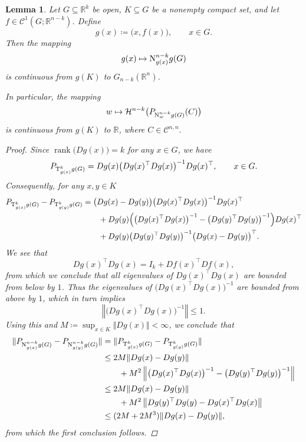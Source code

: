 \documentclass[pdflatex,sn-mathphys-num]{sn-jnl}
\theoremstyle{plain}
\newtheorem{lemma}[theorem]{Lemma}
\theoremstyle{definition}
\DeclareMathOperator{\rank}{rank}
\begin{document}
\begin{lemma}\label{gong}
    Let $G\subseteq\mathbb{R}^k$ be open, $K\subseteq G$ be a nonempty compact set, and let $f\in\mathcal{C}^1(G; \mathbb{R}^{n-k})$. Define $$g(x)\coloneq\big(x, f(x)\big), \qquad x\in G.$$ Then the mapping
\[
g(x)\mapsto \textup{N}^{n-k}_{g(x)}g(G)
\]
is continuous from $g(K)$ to $G_{n-k}(\mathbb R^n)$.
    
    In particular, the mapping $$w\mapsto \mathcal{H}^{n-k}\big(P_{\textup{N}^{n-k}_w g(G)}(C)\big)$$ is continuous from $g(K)$ to $\mathbb{R}$, where $C\in\mathcal{C}^{n, n}$. \begin{proof}
        Since $\rank\big(Dg(x)\big)=k$ for any $x\in G$, we have $$P_{\textup{T}^k_{g(x)}g(G)}=Dg(x)\big(Dg(x)^{\top}Dg(x)\big)^{-1}Dg(x)^{\top}, \qquad x\in G.$$ Consequently, for any $x, y\in K$\begin{equation*}
        \begin{split}
           P_{\textup{T}^k_{g(x)}g(G)}-P_{\textup{T}^k_{g(y)}g(G)}&=\big(Dg(x)-Dg(y)\big)\big(Dg(x)^{\top}Dg(x)\big)^{-1}Dg(x)^{\top}\\&\quad\quad+Dg(y)\Big(\big(Dg(x)^{\top}Dg(x)\big)^{-1}-\big(Dg(y)^{\top}Dg(y)\big)^{-1}\Big)Dg(x)^{\top} \\&\quad\quad+Dg(y)\big(Dg(y)^{\top}Dg(y)\big)^{-1}\big(Dg(x)-Dg(y)\big)^{\top}.
        \end{split}
        \end{equation*}
        We see that $$Dg(x)^{\top}Dg(x)=I_k+Df(x)^{\top}Df(x),$$ from which we conclude that all eigenvalues of $Dg(x)^{\top}Dg(x)$ are bounded from below by $1$. Thus the eigenvalues of $\big(Dg(x)^{\top}Dg(x)\big)^{-1}$ are bounded from above by $1$, which in turn implies $$\left\Vert\big(Dg(x)^{\top}Dg(x)\big)^{-1}\right\Vert\leq 1.$$ Using this and $M\coloneq\sup_{x\in K}\Vert Dg(x)\Vert<\infty$, we conclude that \begin{equation*}
        \begin{split}\Vert P_{\textup{N}^{n-k}_{g(x)}g(G)}-P_{\textup{N}^{n-k}_{g(y)}g(G)}\Vert&=\Vert P_{\textup{T}^k_{g(x)}g(G)}-P_{\textup{T}^k_{g(y)}g(G)}\Vert\\&\leq 2M\Vert Dg(x)-Dg(y)\Vert\\&\quad\quad+M^ {2}\left\Vert \big(Dg(x)^{\top}Dg(x)\big)^{-1}-\big(Dg(y)^{\top}Dg(y)\big)^{-1}\right\Vert\\&\leq 2M\Vert Dg(x)-Dg(y)\Vert\\&\quad\quad+M^ {2}\left\Vert Dg(y)^{\top}Dg(y)-Dg(x)^{\top}Dg(x)\right\Vert\\&\leq (2M+2M^{3})\Vert Dg(x)-Dg(y)\Vert,
        \end{split}
        \end{equation*} from which the first conclusion follows.


\end{proof}
\end{lemma}
\end{document}
